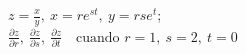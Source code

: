 \item $z = \frac{x}{y}, \ x = re^{st}, \ y = rse^t$; \\
$\frac{\partial z}{\partial r}, \ \frac{\partial z}{\partial s}, \ \frac{\partial z}{\partial t} \quad \text{cuando } r = 1, \ s = 2, \ t = 0$
